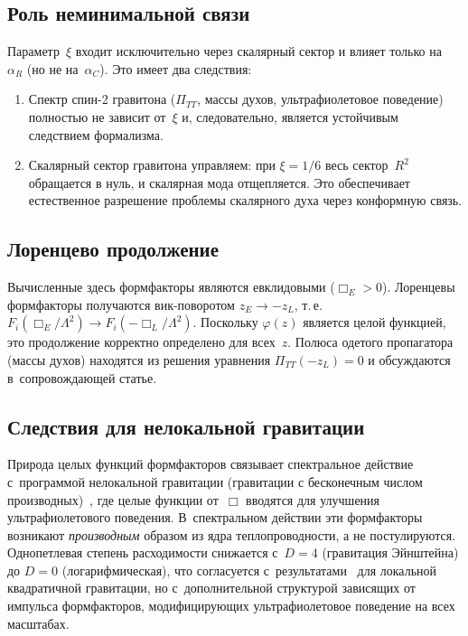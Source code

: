 \documentclass[12pt,a4paper]{article}
\begin{document}
\subsection{Роль неминимальной связи}

Параметр~$\xi$ входит исключительно через скалярный сектор и влияет
только на~$\alpha_R$ (но не на~$\alpha_C$). Это имеет два следствия:
\begin{enumerate}
\item Спектр спин-2 гравитона ($\Pi_{TT}$, массы духов, ультрафиолетовое
  поведение) полностью не зависит от~$\xi$ и, следовательно, является
  устойчивым следствием формализма.
\item Скалярный сектор гравитона управляем: при $\xi = 1/6$ весь сектор~$R^2$
  обращается в нуль, и скалярная мода отщепляется. Это обеспечивает
  естественное разрешение проблемы скалярного духа через конформную связь.
\end{enumerate}

\subsection{Лоренцево продолжение}

Вычисленные здесь формфакторы являются евклидовыми ($\Box_E > 0$). Лоренцевы
формфакторы получаются вик-поворотом $z_E \to -z_L$, т.\,е.\
$F_i(\Box_E/\Lambda^2) \to F_i(-\Box_L/\Lambda^2)$. Поскольку $\varphi(z)$
является целой функцией, это продолжение корректно определено для всех~$z$.
Полюса одетого пропагатора (массы духов) находятся из решения уравнения
$\Pi_{TT}(-z_L) = 0$ и обсуждаются в~сопровождающей статье.

\subsection{Следствия для нелокальной гравитации}

Природа целых функций формфакторов связывает спектральное действие
с~программой нелокальной гравитации (гравитации с бесконечным числом
производных)~\cite{Modesto:2011kw,Tomboulis:1997gg,Biswas:2011ar}, где целые
функции от~$\Box$ вводятся для улучшения ультрафиолетового поведения.
В~спектральном действии эти формфакторы возникают \emph{производным} образом
из ядра теплопроводности, а не постулируются. Однопетлевая степень расходимости
снижается с~$D = 4$ (гравитация Эйнштейна) до $D = 0$ (логарифмическая), что
согласуется с~результатами~\cite{Stelle:1976gc} для локальной квадратичной
гравитации, но с~дополнительной структурой зависящих от импульса формфакторов,
модифицирующих ультрафиолетовое поведение на всех масштабах.
\end{document}
